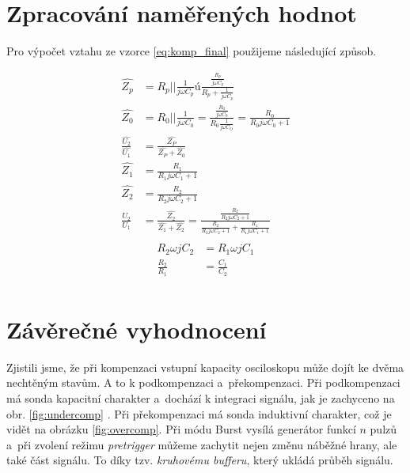 \documentclass[a4paper,12pt]{article}   %
\begin{document}
\section{Zpracování naměřených hodnot}
\label{chap:zpracovani_hodnot}
Pro výpočet vztahu ze vzorce \ref{eq:komp_final} použijeme následující způsob.

\begin{equation}
  \begin{split}
    \hat{Z_p} &= R_p || \frac{1}{j\omega C_p} ú \frac{\frac{R_p}{j\omega C_p}}{R_p+\frac{1}{j \omega C_p}}\\
    \hat{Z_0} &= R_0 || \frac{1}{j\omega C_0} = \frac{\frac{R_0}{j\omega C_0}}{R_0\frac{1}{j\omega C_O}} = \frac{R_0}{R_0 j\omega C_0 +1}\\
    \frac{\hat{U_2}}{\hat{U_1}} &= \frac{\hat{Z_P}}{\hat{Z_P} + \hat{Z_0}}\\
    \hat{Z_1} &= \frac{R_1}{R_1 j\omega C_1 +1}\\
    \hat{Z_2} &= \frac{R_2}{R_2 j\omega C_2 +1}\\
    \frac{U_2}{U_1} &= \frac{\hat{Z_2}}{\hat{Z_1} + \hat{Z_2}} = \frac{\frac{R_2}{R_2 j\omega C_2 +1}}{\frac{R_2}{R_2 j\omega C_2 +1} + \frac{R_1}{R_1 j\omega C_1 +1}}\\
  \end{split}
\end{equation}
\begin{equation}
  \begin{split}
    R_2\omega j C_2 &= R_1 \omega j C_1\\
    \frac{R_2}{R_1} &= \frac{C_1}{C_2}\\
  \end{split}
\end{equation}


\section{Závěrečné vyhodnocení}
\label{chap:zaver}
Zjistili jsme, že při kompenzaci vstupní kapacity osciloskopu může dojít ke dvěma nechtěným stavům. A to k podkompenzaci a~překompenzaci. Při podkompenzaci má sonda kapacitní charakter a~dochází k integraci signálu, jak je zachyceno na obr. \ref{fig:undercomp} . Při překompenzaci má sonda induktivní charakter, což je vidět na obrázku \ref{fig:overcomp}. Při módu Burst vysílá generátor funkcí $n$ pulzů a~při zvolení režimu \textit{pretrigger} můžeme zachytit nejen změnu náběžné hrany, ale také část signálu. To díky tzv. \textit{kruhovému bufferu}, který ukládá průběh signálu. 
\end{document}
